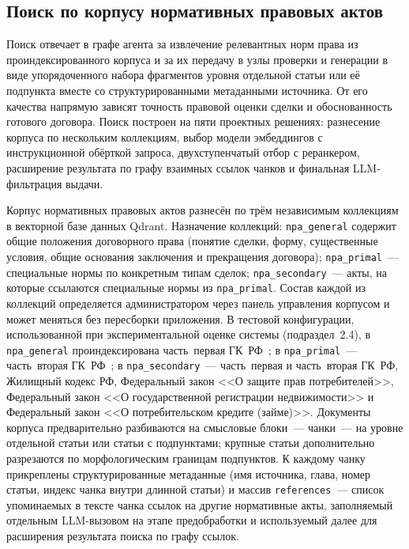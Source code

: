 \subsection{Поиск по корпусу нормативных правовых актов}

Поиск отвечает в графе агента за извлечение релевантных норм права из проиндексированного корпуса и за их передачу в узлы проверки и генерации в виде упорядоченного набора фрагментов уровня отдельной статьи или её подпункта вместе со структурированными метаданными источника. От его качества напрямую зависят точность правовой оценки сделки и обоснованность готового договора. Поиск построен на пяти проектных решениях: разнесение корпуса по нескольким коллекциям, выбор модели эмбеддингов с инструкционной обёрткой запроса, двухступенчатый отбор с реранкером, расширение результата по графу взаимных ссылок чанков и финальная LLM-фильтрация выдачи.

Корпус нормативных правовых актов разнесён по трём независимым коллекциям в векторной базе данных Qdrant. Назначение коллекций: \texttt{npa\_general} содержит общие положения договорного права (понятие сделки, форму, существенные условия, общие основания заключения и прекращения договора); \texttt{npa\_primal}~--- специальные нормы по конкретным типам сделок; \texttt{npa\_secondary}~--- акты, на которые ссылаются специальные нормы из \texttt{npa\_primal}. Состав каждой из коллекций определяется администратором через панель управления корпусом и может меняться без пересборки приложения. В тестовой конфигурации, использованной при экспериментальной оценке системы (подраздел~2.4), в \texttt{npa\_general} проиндексирована часть~первая ГК~РФ~\cite{gk_rf_part1}; в \texttt{npa\_primal}~--- часть~вторая ГК~РФ~\cite{gk_rf_part2}; в \texttt{npa\_secondary}~--- часть~первая и часть~вторая ГК~РФ, Жилищный кодекс РФ, Федеральный закон <<О защите прав потребителей>>, Федеральный закон <<О государственной регистрации недвижимости>> и Федеральный закон <<О потребительском кредите (займе)>>. Документы корпуса предварительно разбиваются на смысловые блоки~--- чанки~--- на уровне отдельной статьи или статьи с подпунктами; крупные статьи дополнительно разрезаются по морфологическим границам подпунктов. К каждому чанку прикреплены структурированные метаданные (имя источника, глава, номер статьи, индекс чанка внутри длинной статьи) и массив \texttt{references}~--- список упоминаемых в тексте чанка ссылок на другие нормативные акты, заполняемый отдельным LLM-вызовом на этапе предобработки и используемый далее для расширения результата поиска по графу ссылок.

